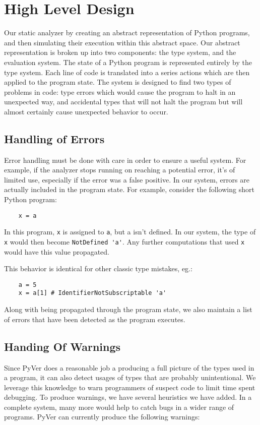 \documentclass{article}[12pt]
\begin{document}
\section{High Level Design}
  Our static analyzer by creating an abstract representation of Python programs, and then simulating
  their execution within this abstract space. Our abstract representation is broken up into two
  components: the type system, and the evaluation system. The state of a Python program is
  represented entirely by the type system. Each line of code is translated into a series actions
  which are then applied to the program state. The system is designed to find two types of problems
  in code: type errors which would cause the program to halt in an unexpected way, and accidental
  types that will not halt the program but will almost certainly cause unexpected behavior to occur.

\subsection{Handling of Errors}
Error handling must be done with care in order to ensure a useful system. For example, if the
analyzer stops running on reaching a potential error, it's of limited use, especially if the error
was a false positive. In our system, errors are actually included in the program state. For
example, consider the following short Python program:
\begin{verbatim}
    x = a
\end{verbatim}
In this program, \verb=x= is assigned to \verb=a=, but a isn't defined. In our system, the type of
\verb=x= would then become \verb=NotDefined 'a'=. Any further computations that used \verb=x= would
have this value propagated.

This behavior is identical for other classic type mistakes, eg.:
\begin{verbatim}
    a = 5
    x = a[1] # IdentifierNotSubscriptable 'a'
\end{verbatim}
Along with being propagated through the program state, we also maintain a list of errors that have
been detected as the program executes.

\subsection{Handing Of Warnings}
Since PyVer does a reasonable job a producing a full picture of the types used in a program, it
can also detect usages of types that are probably unintentional. We leverage this knowledge to warn
programmers of suspect code to limit time spent debugging. To produce warnings, we have several heuristics we have added. In a complete system, many more would
help to catch bugs in a wider range of programs. PyVer can currently produce the following warnings:
\end{document}

